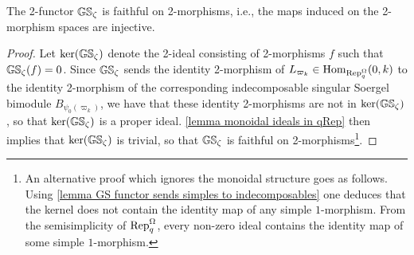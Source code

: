 \begin{lemma}
    The 2-functor $\mathbb{GS}_\zeta$ is faithful on 2-morphisms, i.e., the maps induced on the 2-morphism spaces are injective.
\end{lemma}

\begin{proof}
    Let $\ker (\mathbb{GS}_\zeta)$ denote the 2-ideal consisting of 2-morphisms $f$ such that $\mathbb{GS}_\zeta(f)=0$.
    Since $\mathbb{GS}_\zeta$ sends the identity 2-morphism of $L_{\varpi_k} \in \operatorname{Hom}_{\operatorname{Rep}_q^{\Omega}}(0,k)$ to the identity 2-morphism of the corresponding indecomposable singular Soergel bimodule $B_{\psi_0(\varpi_k)}$, we have that these identity 2-morphisms are not in $\ker(\mathbb{GS}_\zeta)$, so that $\ker(\mathbb{GS}_\zeta)$ is a proper ideal. \cref{lemma monoidal ideals in qRep} then  implies that $\ker(\mathbb{GS}_\zeta)$ is trivial, so that $\mathbb{GS}_\zeta$ is faithful on 2-morphisms\footnote{An alternative proof which ignores the monoidal structure goes as follows. Using \cref{lemma GS functor sends simples to indecomposables} one deduces that the kernel does not contain the identity map of any simple $1$-morphism. From the semisimplicity of $\operatorname{Rep}_q^{\Omega}$, every non-zero ideal contains the identity map of some simple $1$-morphism.}.
\end{proof}



